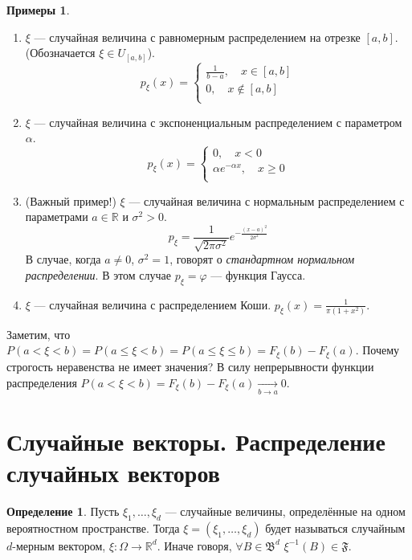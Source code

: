 \documentclass[11pt,openany,a4paper]{scrartcl}
\theoremstyle{plain}
\theoremstyle{definition}
\newtheorem{definition}[theorem]{Определение}
\newtheorem{examples}[theorem]{Примеры}
\newcommand\mb{\mathbb}
\newcommand\real{\mb R}
\newcommand{\underto}[1]{\xrightarrow[#1]{}}
\begin{document}
\begin{examples}
    \begin{enumerate}
        \item $\xi$ — случайная величина с равномерным распределением на
        отрезке $[a,b]$. (Обозначается $\xi \in U_{[a,b]}$).
        $$
        p_\xi (x) =
        \begin{cases}
            \frac{1}{b-a},\quad x \in [a,b] \\
            0, \quad x \notin [a,b] \\
        \end{cases}
        $$
        \item $\xi$ — случайная величина с экспоненциальным распределением с 
        параметром $\alpha$.
        $$
        p_\xi(x) =
        \begin{cases}
            0,\quad x < 0 \\
            \alpha e^{-\alpha x},\quad x \geqslant 0 \\
        \end{cases}
        $$
        \item (Важный пример!) $\xi$ — случайная величина с нормальным 
        распределением с параметрами $a \in \real$ и $\sigma^2 > 0$.
        $$
        p_\xi = \frac{1}{\sqrt{2\pi \sigma^2}}e^{- \frac{(x - a)^2}{2\sigma^2}}
        $$
        В случае, когда $a \neq 0$, $\sigma^2 = 1$, говорят о \emph{стандартном 
        нормальном распределении}.
        В этом случае $p_\xi = \varphi$ — функция Гаусса.
        \item $\xi$ — случайная величина с распределением Коши.
        $p_\xi(x) = \frac{1}{\pi (1 + x^2)}$.
    \end{enumerate}
\end{examples}

Заметим, что $P(a < \xi < b) = P(a \leqslant \xi < b) =
P(a \leqslant \xi \leqslant b) = F_\xi(b) - F_\xi(a)$. Почему строгость неравенства
не имеет значения? В силу непрерывности функции распределения
$P(a < \xi < b) = F_\xi(b) - F_\xi(a) \underto{b \to a} 0$.

\section{Случайные векторы. Распределение случайных векторов}

\begin{definition}
    Пусть $\xi_1, \ldots, \xi_d$ — случайные величины, определённые на одном
    вероятностном пространстве. Тогда $\xi = (\xi_1, \ldots, \xi_d)$ будет
    называться случайным $d$-мерным вектором, $\xi: \Omega \to \real^d$.
    Иначе говоря, $\forall B \in \mathfrak B^d$ $\xi^{-1}(B) \in \mathfrak F$.
\end{definition}
\end{document}
